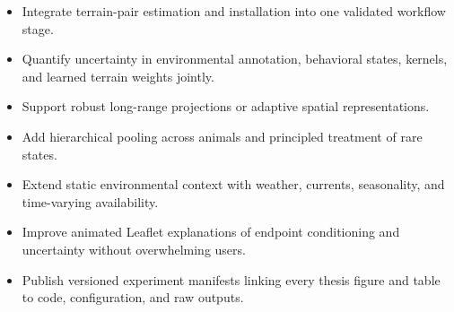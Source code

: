 \begin{itemize}
  \item Integrate terrain-pair estimation and installation into one validated workflow stage.
  \item Quantify uncertainty in environmental annotation, behavioral states, kernels, and learned terrain weights jointly.
  \item Support robust long-range projections or adaptive spatial representations.
  \item Add hierarchical pooling across animals and principled treatment of rare states.
  \item Extend static environmental context with weather, currents, seasonality, and time-varying availability.
  \item Improve animated Leaflet explanations of endpoint conditioning and uncertainty without overwhelming users.
  \item Publish versioned experiment manifests linking every thesis figure and table to code, configuration, and raw outputs.
\end{itemize}
